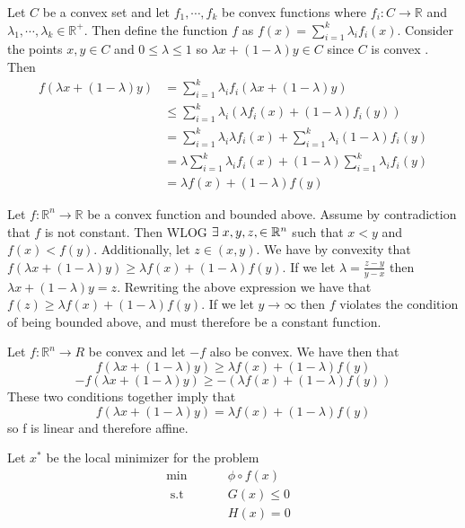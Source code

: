 \documentclass[12pt]{article}
\newcommand{\R}{\mathbb{R}}
\newenvironment{problem}[2][Problem]{\begin{trivlist}
\item[\hskip \labelsep {\bfseries #1}\hskip \labelsep {\bfseries #2}]}{\end{trivlist}}
\begin{document}
\begin{problem}{7.} 
Let $C$ be a convex set and let $f_1, \cdots, f_k$ be convex functions where $f_i:C \to \R$ and $\lambda_1, \cdots, \lambda_k \in \R^+$. Then define the function $f$ as $f(x) = \sum_{i=1}^{k} \lambda_if_i(x)$. Consider the points $x, y \in C$ and $0 \leq \lambda \leq 1$ so $\lambda x + (1-\lambda)y \in C$ since $C$ is convex . Then
\begin{align*}
 f(\lambda x + (1-\lambda)y) &= \sum_{i=1}^{k} \lambda_if_i(\lambda x + (1-\lambda)y) \\
 & \leq \sum_{i=1}^{k} \lambda_i (\lambda f_i(x) + (1-\lambda)f_i(y))   \\
  & =\sum_{i=1}^{k} \lambda_i \lambda f_i(x) + \sum_{i=1}^{k}  \lambda_i(1-\lambda)f_i(y) \\
  & =\lambda  \sum_{i=1}^{k} \lambda_i f_i(x) + (1-\lambda) \sum_{i=1}^{k}  \lambda_if_i(y) \\
  & = \lambda f(x) + (1- \lambda) f(y)
 \end{align*}
\end{problem}

\begin{problem}{13.} 
Let $f: \R^n \to \R$ be a convex function and bounded above. Assume by contradiction that $f$ is not constant. Then WLOG $\exists \hspace{0.1cm} x,y, z, \in \R^n$ such that $x <y $ and $f(x) < f(y)$. Additionally, let  $z \in (x,y)$. We have by convexity that $f(\lambda x + (1-\lambda) y) \geq \lambda f(x) + (1 - \lambda) f(y)$. If we let $\lambda  = \frac{z-y}{y-x}$ then $\lambda x + (1-\lambda) y = z$. Rewriting the above expression we have that $f(z) \geq \lambda f(x) + (1 - \lambda) f(y)$. If we let $y \to \infty$ then $f$ violates the condition of being bounded above, and must therefore be a constant function. 
\end{problem}

\begin{problem}{20.} 
Let $f: \R^n \to R$ be convex and let $-f$ also be convex. We have then that 
$$f(\lambda x + (1-\lambda) y) \geq \lambda f(x) + (1 - \lambda) f(y)$$
$$- f(\lambda x + (1-\lambda) y) \geq - (\lambda f(x) + (1 - \lambda) f(y))$$
These two conditions together imply that 
$$f(\lambda x + (1-\lambda) y) = \lambda f(x) + (1 - \lambda) f(y)$$
so f is linear and therefore affine. 
\end{problem}

\begin{problem}{21.} 
Let $x^*$ be the local minimizer for the problem
\begin{align*}
\min \hspace{1cm} & \phi \circ f(x) &\\
 \text{ s.t } \hspace{1cm}  & G(x) \leq 0& \\
&H(x) = 0&
\end{align*}
\end{problem}
\end{document}
